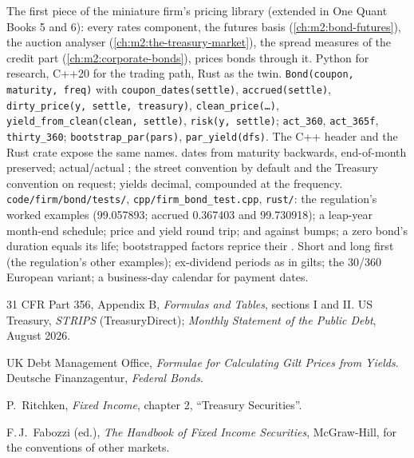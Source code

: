 \begin{build}
 The first piece of the miniature firm's pricing library
(extended in One Quant Books 5 and 6): every rates component, the futures basis
(\cref{ch:m2:bond-futures}), the auction analyser
(\cref{ch:m2:the-treasury-market}), the spread measures of the credit part
(\cref{ch:m2:corporate-bonds}), prices bonds through it. Python for research,
C++20 for the trading path, Rust as the twin.
 \texttt{Bond(coupon, maturity, freq)} with
\texttt{coupon\_dates(settle)}, \texttt{accrued(settle)},
\texttt{dirty\_price(y, settle, treasury)}, \texttt{clean\_price(\ldots)},
\texttt{yield\_from\_clean(clean, settle)}, \texttt{risk(y, settle)};
\texttt{act\_360}, \texttt{act\_365f}, \texttt{thirty\_360};
\texttt{bootstrap\_par(pars)}, \texttt{par\_yield(dfs)}. The C++ header and the
Rust crate expose the same names.
  dates from maturity backwards, end-of-month preserved;
actual/actual ; the street convention by default and the
Treasury convention on request; yields decimal, compounded at the 
frequency.
 \texttt{code/firm/bond/tests/},
\texttt{cpp/firm\_bond\_test.cpp}, \texttt{rust/}: the regulation's worked
examples (99.057893; accrued 0.367403 and 99.730918); a leap-year month-end
schedule; price and yield round trip;  and  against bumps; a zero
bond's duration equals its life; bootstrapped factors reprice their .
 Short and long first  (the regulation's other
examples); ex-dividend periods as in gilts; the 30/360 European variant; a
business-day calendar for payment dates.
\end{build}

\begin{omsources}
\item 31 CFR Part 356, Appendix B, \emph{Formulas and Tables}, sections I and
II. US Treasury, \emph{STRIPS} (TreasuryDirect); \emph{Monthly Statement of
the Public Debt}, August 2026.
\item UK Debt Management Office, \emph{Formulae for Calculating Gilt Prices
from Yields}. Deutsche Finanzagentur, \emph{Federal Bonds}.
\item P.\ Ritchken, \emph{Fixed Income}, chapter 2, ``Treasury Securities''.
\item F.\,J.\ Fabozzi (ed.), \emph{The Handbook of Fixed Income Securities},
McGraw-Hill, for the conventions of other markets.
\end{omsources}

